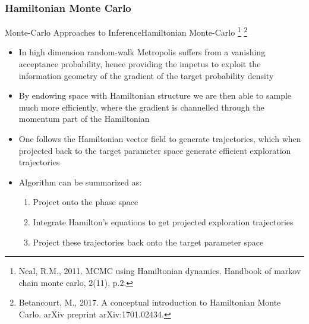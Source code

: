 \documentclass[AERbeamer%
              ,optEnglish%
              ,optBiber%
              ,optBibstyleAlphabetic%
              ,optBeamerClassicFormat%
              ]{AERlatex}%
\begin{document}
\subsubsection*{Hamiltonian Monte Carlo}
\begin{frame}[c]{Monte-Carlo Approaches to Inference}{Hamiltonian Monte-Carlo \footnote{Neal, R.M., 2011. MCMC using Hamiltonian dynamics. Handbook of markov chain monte carlo, 2(11), p.2.}
                                                                              \footnote{Betancourt, M., 2017. A conceptual introduction to Hamiltonian Monte Carlo. arXiv preprint arXiv:1701.02434.}}
    \centering
    \begin{itemize}
        \item In high dimension random-walk Metropolis suffers from a vanishing acceptance probability, hence providing the impetus
              to exploit the information geometry of the gradient of the target probability density
        \item By endowing space with Hamiltonian structure we are then able to sample much more efficiently, where the gradient is
              channelled through the momentum part of the Hamiltonian
        \item One follows the Hamiltonian vector field to generate trajectories, which when projected back to the target parameter
              space generate efficient exploration trajectories
        \item Algorithm can be summarized as:
        \begin{enumerate}
            \item Project onto the phase space
            \item Integrate Hamilton's equations to get projected exploration trajectories
            \item Project these trajectories back onto the target parameter space
        \end{enumerate}
    \end{itemize}
\end{frame}
\end{document}
